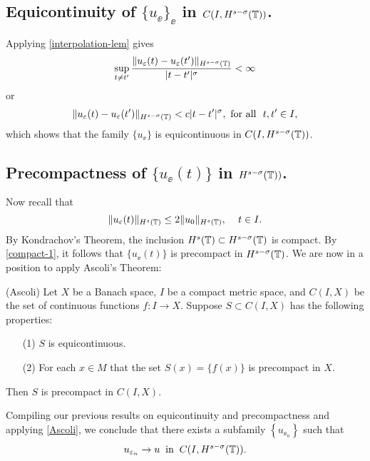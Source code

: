 \subsection{Equicontinuity of $\{u_\ee\}_\ee$  in
$C(I,H^{s-\sigma}(\mathbb{T}))$.} Applying  \cref{interpolation-lem} gives 
%
\begin{equation}
\label{equic-1}
\sup_{t \neq t'} \frac {\|u_\varepsilon(t) - u_\varepsilon(t') \|_{H^{s -
\sigma}(\mathbb{T})}}{|t - t'|^\sigma} < \infty
\end{equation}
%
or
%
\begin{equation}
\label{equic-2}
\|u_\varepsilon(t) - u_\varepsilon(t') \|_{H^{s - \sigma}(\mathbb{T})}< c|t - t'|^\sigma, 
 \ \text{for all} \  \,\,  t, t'\in I,
\end{equation}
%
which shows that  the family  $\{u_\ee\}$ is equicontinuous in 
$C(I, H^{s-\sigma}(\mathbb{T}))$.
%
%
%
%
%
%
%
%
%
%
%		
\subsection{Precompactness of $\{u_\ee(t)\}$ in $H^{s-\sigma}(\mathbb{T}))$.}
Now recall that
\begin{equation}
\label{compact-1}
\|u_\varepsilon(t)\|_{H^{s}(\mathbb{T})}
\le
2 \|u_0 \|_{H^s(\mathbb{T})}, \,
\quad
t\in I.
\end{equation}
%
By Kondrachov's Theorem, the inclusion $H^s(\mathbb{T}) \subset H^{s-
\sigma }(\mathbb{T})$ is compact. By \eqref{compact-1},
it follows that $\{u_\ee(t)\}$ is precompact in $H^{s-\sigma}(\mathbb{T})$.
%
%
%
%
We are now in a position to apply Ascoli's Theorem: 
\begin{theorem}
\label{Ascoli}
(Ascoli)  Let $X$ be a Banach space, $I$ be a compact metric space,
and $C(I,X)$  be the set of continuous functions $f: I\longrightarrow X$.
Suppose $S \subset C(I,X)$  has the following properties:
%
\begin{itemize}
\item[(1)]   $S$ is  equicontinuous.
\item[(2)]  For each $x \in M$ that the set $S(x) = \{f(x)\}$  is  precompact in $X$.
\end{itemize} 
%
Then $S$  is  precompact  in  $C(I,X)$.
\end{theorem}
Compiling our previous results on equicontinuity and precompactness
and applying \cref{Ascoli}, we
conclude that there exists a subfamily $\left\{ u_{\ee_n} \right\}$
such that
\begin{equation}
\label{strong-conv-of-u_ep}
u_{\varepsilon_n} \to u \; \; \text{in} \; \; C(I, H^{s-\sigma}(\mathbb{T})).
\end{equation}
%
%
%
%
%
%
%
